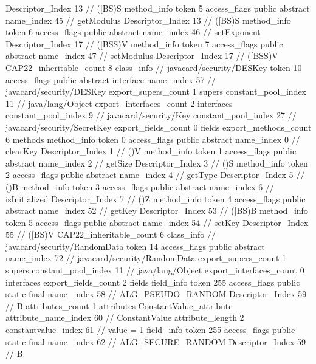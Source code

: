 {{{{{					Descriptor_Index	13		// ([BS)S
				}
				method_info {
					token	5
					access_flags	public abstract
					name_index	45		// getModulus
					Descriptor_Index	13		// ([BS)S
				}
				method_info {
					token	6
					access_flags	public abstract
					name_index	46		// setExponent
					Descriptor_Index	17		// ([BSS)V
				}
				method_info {
					token	7
					access_flags	public abstract
					name_index	47		// setModulus
					Descriptor_Index	17		// ([BSS)V
				}
			}
			CAP22_inheritable_count	8
		}
		class_info {		// javacard/security/DESKey
			token	10
			access_flags	public abstract interface
			name_index	57		// javacard/security/DESKey
			export_supers_count	1
			supers {
				constant_pool_index	11		// java/lang/Object
			}
			export_interfaces_count	2
			interfaces {
				constant_pool_index	9		// javacard/security/Key
				constant_pool_index	27		// javacard/security/SecretKey
			}
			export_fields_count	0
			fields {
			}
			export_methods_count	6
			methods {
				method_info {
					token	0
					access_flags	public abstract
					name_index	0		// clearKey
					Descriptor_Index	1		// ()V
				}
				method_info {
					token	1
					access_flags	public abstract
					name_index	2		// getSize
					Descriptor_Index	3		// ()S
				}
				method_info {
					token	2
					access_flags	public abstract
					name_index	4		// getType
					Descriptor_Index	5		// ()B
				}
				method_info {
					token	3
					access_flags	public abstract
					name_index	6		// isInitialized
					Descriptor_Index	7		// ()Z
				}
				method_info {
					token	4
					access_flags	public abstract
					name_index	52		// getKey
					Descriptor_Index	53		// ([BS)B
				}
				method_info {
					token	5
					access_flags	public abstract
					name_index	54		// setKey
					Descriptor_Index	55		// ([BS)V
				}
			}
			CAP22_inheritable_count	6
		}
		class_info {		// javacard/security/RandomData
			token	14
			access_flags	public abstract
			name_index	72		// javacard/security/RandomData
			export_supers_count	1
			supers {
				constant_pool_index	11		// java/lang/Object
			}
			export_interfaces_count	0
			interfaces {
			}
			export_fields_count	2
			fields {
			field_info {
				token	255
				access_flags	public static final
				name_index	58		// ALG_PSEUDO_RANDOM
				Descriptor_Index	59		// B
				attributes_count	1
				attributes {
				ConstantValue_attribute {
					attribute_name_index	60		// ConstantValue
					attribute_length	2
					constantvalue_index	61		// value = 1
				}
				}
			}
			field_info {
				token	255
				access_flags	public static final
				name_index	62		// ALG_SECURE_RANDOM
				Descriptor_Index	59		// B
}}}}}
